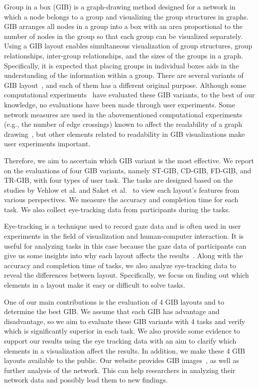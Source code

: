 \documentclass[review]{vgtc}                 %
\begin{document}
Group in a box (GIB) is a graph-drawing method designed for a network in which a node belongs to a group and visualizing the group structures in graphs.
GIB arranges all nodes in a group into a box with an area proportional to the number of nodes in the group so that each group can be visualized separately.
Using a GIB layout enables simultaneous visualization of group structures, group relationships, inter-group relationships, and the sizes of the groups in a graph.
Specifically, it is expected that placing groups in individual boxes aids in the understanding of the information within a group.
There are several variants of GIB layout~\cite{rodrigues2011group,chaturvedi2014group,onoue2017optimal}, and each of them has a different original purpose.
Although some computational experiments~\cite{chaturvedi2014group,onoue2017optimal} have evaluated these GIB variants, to the best of our knowledge, no evaluations have been made through user experiments.
Some network measures are used in the abovementioned computational experiments (e.g., the number of edge crossings) known to affect the readability of a graph drawing~\cite{468391,purchase1997aesthetic,purchase1998performance,purchase2002empirical}, but other elements related to readability in GIB visualizations make user experiments important.

Therefore, we aim to ascertain which GIB variant is the most effective.
We report on the evaluations of four GIB variants, namely ST-GIB, CD-GIB, FD-GIB, and TR-GIB, with four types of user task. The tasks are designed based on the studies by Vehlow et al.
\cite{Vehlow2017VisualizingGS} and Saket et al.~\cite{saket2014group} to view each layout's features from various perspectives.
We measure the accuracy and completion time for each task.
We also collect eye-tracking data from participants during the tasks.

Eye-tracking is a technique used to record gaze data and is often used in user experiments in the field of visualization and human-computer interaction.
It is useful for analyzing tasks in this case because the gaze data of participants can give us some insights into why each layout affects the results~\cite{andrienko2012visual,duchowski2007eye,kurzhals2014evaluating}.
Along with the accuracy and completion time of tasks, we also analyze eye-tracking data to reveal the differences between layout.
Specifically, we focus on finding out which elements in a layout make it easy or difficult to solve tasks.

One of our main contributions is the evaluation of 4 GIB layouts and to determine the best GIB.
We assume that each GIB has advantage and disadvantage, so we aim to evaluate these GIB variants with 4 tasks and verify which is significantly superior in each task.
We also provide some evidence to support our results using the eye tracking data with an aim to clarify which elements in a visualization affect the results.
In addition, we make these 4 GIB layouts available to the public. Our website provides GIB images~\cite{gibweb}, as well as further analysis of the network. This can help researchers in analyzing their network data and possibly lead them to new findings.
\end{document}
